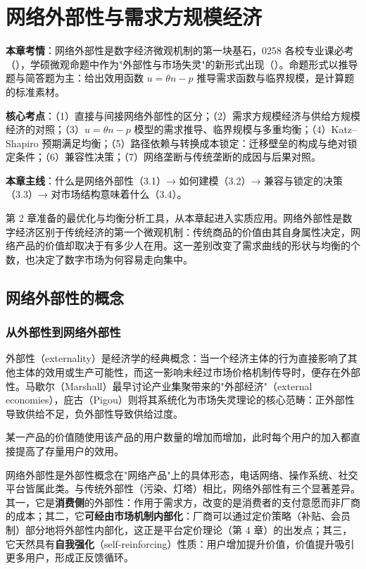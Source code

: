 \chapter{网络外部性与需求方规模经济}

\begin{examguide}
\textbf{本章考情}：网络外部性是数字经济微观机制的第一块基石，0258 各校专业课必考（），学硕微观命题中作为"外部性与市场失灵"的新形式出现（）。命题形式以推导题与简答题为主：给出效用函数 $u = \theta n - p$ 推导需求函数与临界规模，是计算题的标准素材。

\textbf{核心考点}：（1）直接与间接网络外部性的区分；（2）需求方规模经济与供给方规模经济的对照；（3）$u=\theta n - p$ 模型的需求推导、临界规模与多重均衡；（4）Katz–Shapiro 预期满足均衡；（5）路径依赖与转换成本锁定：迁移壁垒的构成与绝对锁定条件；（6）兼容性决策；（7）网络垄断与传统垄断的成因与后果对照。

\textbf{本章主线}：什么是网络外部性（3.1）→ 如何建模（3.2）→ 兼容与锁定的决策（3.3）→ 对市场结构意味着什么（3.4）。
\end{examguide}

第 2 章准备的最优化与均衡分析工具，从本章起进入实质应用。网络外部性是数字经济区别于传统经济的第一个微观机制：传统商品的价值由其自身属性决定，网络产品的价值却取决于有多少人在用。这一差别改变了需求曲线的形状与均衡的个数，也决定了数字市场为何容易走向集中。

\section{网络外部性的概念}

\subsection{从外部性到网络外部性}

外部性（externality）是经济学的经典概念：当一个经济主体的行为直接影响了其他主体的效用或生产可能性，而这一影响未经过市场价格机制传导时，便存在外部性。马歇尔（Marshall）最早讨论产业集聚带来的"外部经济"（external economies），庇古（Pigou）则将其系统化为市场失灵理论的核心范畴：正外部性导致供给不足，负外部性导致供给过度。

\begin{definition}
某一产品的价值随使用该产品的用户数量的增加而增加，此时每个用户的加入都直接提高了存量用户的效用。
\end{definition}

网络外部性是外部性概念在"网络产品"上的具体形态，电话网络、操作系统、社交平台皆属此类。与传统外部性（污染、灯塔）相比，网络外部性有三个显著差异。其一，它是\textbf{消费侧}的外部性：作用于需求方，改变的是消费者的支付意愿而非厂商的成本；其二，它\textbf{可经由市场机制内部化}：厂商可以通过定价策略（补贴、会员制）部分地将外部性内部化，这正是平台定价理论（第 4 章）的出发点；其三，它天然具有\textbf{自我强化}（self-reinforcing）性质：用户增加提升价值，价值提升吸引更多用户，形成正反馈循环。

